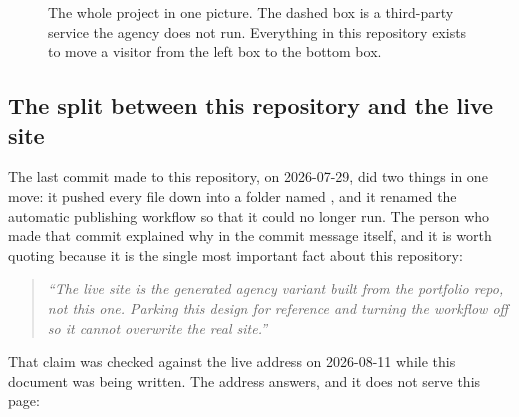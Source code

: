 \documentclass[11pt,a4paper]{article}
\begin{document}
\begin{figure}[H]\centering
{}
\caption{The whole project in one picture. The dashed box is a third-party
service the agency does not run. Everything in this repository exists to move a
visitor from the left box to the bottom box.}
\end{figure}

\subsection{The split between this repository and the live site}

The last commit made to this repository,  on 2026-07-29, did two
things in one move: it pushed every file down into a folder named
, and it renamed the automatic publishing workflow so
that it could no longer run. The person who made that commit explained why in the
commit message itself, and it is worth quoting because it is the single most
important fact about this repository:

\begin{quote}
\emph{``The live site is the generated agency variant built from the portfolio
repo, not this one. Parking this design for reference and turning the workflow
off so it cannot overwrite the real site.''}
\end{quote}

That claim was checked against the live address on 2026-08-11 while this document
was being written. The address answers, and it does not serve this page:
\end{document}
